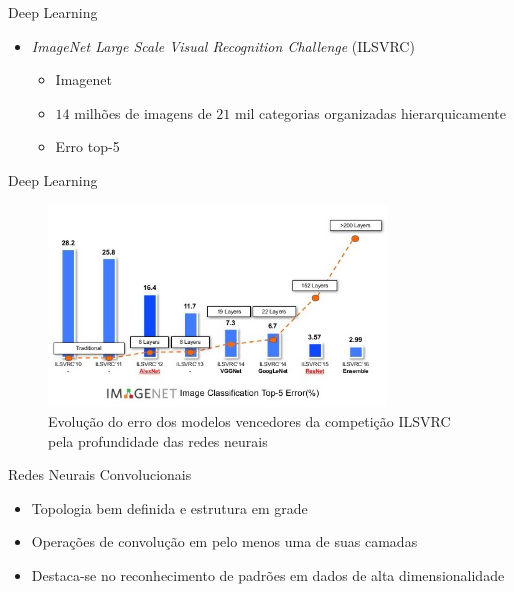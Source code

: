 \begin{frame}{Deep Learning}
   \ \  \\[0.1cm]
   \begin{itemize}
     \item \emph{ImageNet Large Scale Visual Recognition Challenge} (ILSVRC)
     \begin{itemize}
       \item Imagenet
       \item $14$ milhões de imagens de $21$ mil categorias organizadas hierarquicamente
       \item Erro top-5
     \end{itemize}
   \end{itemize}
\end{frame}

\begin{frame}{Deep Learning}
   \ \  \\[0.1cm]
   \begin{figure}[ht]
   	\centering
   	\caption{Evolução do erro dos modelos vencedores da competição ILSVRC pela profundidade das redes neurais}
   	\label{fig:compara_redes_ilsvrc}
   	\includegraphics[width=0.8\textwidth]{img/compara_redes_ilsvrc.png}
   \end{figure}
\end{frame}

\begin{frame}{Redes Neurais Convolucionais}
   \ \  \\[0.1cm]
   \begin{itemize}
     \item Topologia bem definida e estrutura em grade
     \item Operações de convolução em pelo menos uma de suas camadas
     \item Destaca-se no reconhecimento de padrões em dados de alta dimensionalidade
   \end{itemize}
\end{frame}

